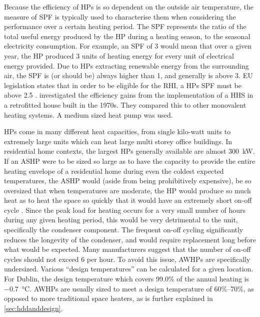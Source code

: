 Because the efficiency of \acp{HP} is so dependent on the outside air temperature, the measure of \ac{SPF} is typically used to characterise them when considering the performance over a certain heating period. The \ac{SPF} represents the ratio of the total useful energy produced by the \ac{HP} during a heating season, to the seasonal electricity consumption. For example, an \ac{SPF} of 3 would mean that over a given year, the \ac{HP} produced 3 units of heating energy for every unit of electrical energy provided. Due to \acp{HP} extracting renewable energy from the surrounding air, the \ac{SPF} is (or should be) always higher than 1, and generally is above 3. EU legislation states that in order to be eligible for the \ac{RHI}, a \acp{HP} \ac{SPF} must be above 2.5 \cite{eu-114-2014}. \cite{klein_numerical_2014} investigated the efficiency gains from the implementation of a \ac{HHS} in a retrofitted house built in the 1970s. They compared this to other monovalent heating systems. A medium sized heat pump was used. 

\acp{HP} come in many different heat capacities, from single kilo-watt units to extremely large units which can heat large multi storey office buildings. In residential home contexts, the largest \acp{HP} generally available are almost \SI{300}{\kilo\watt}. If an \ac{ASHP} were to be sized so large as to have the capacity to provide the entire heating envelope of a residential home during even the coldest expected temperatures, the \ac{ASHP} would (aside from being prohibitively expensive), be so oversized that when temperatures are moderate, the \ac{HP} would produce so much heat as to heat the space so quickly that it would have an extremely short on-off cycle \cite{bee_air-source_2019}. Since the peak load for heating occurs for a very small number of hours during any given heating period, this would be very detrimental to the unit, specifically the condenser component. The frequent on-off cycling significantly reduces the longevity of the condenser, and would require replacement long before what would be expected. Many manufacturers suggest that the number of on-off cycles should not exceed 6 per hour. %
To avoid this issue, \acp{AWHP} are specifically undersized. Various ``design temperatures'' can be calculated for a given location. For Dublin, the design temperature which covers 99.0\% of the annual heating is \SI{-0.7}{\celsius}. \acp{AWHP} are usually sized to meet a design temperature of 60\%--70\%, as opposed to more traditional space heaters, as is further explained in \cref{sec:hddanddesign}.

